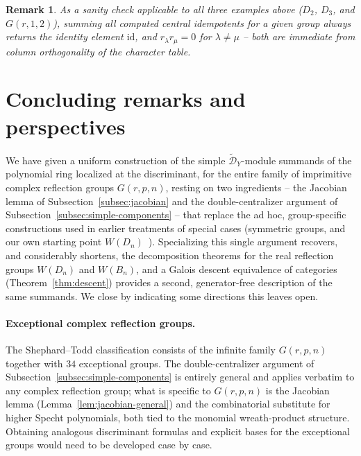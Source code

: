 \documentclass[11pt,a4paper]{article}
\newtheorem{remark}[theorem]{Remark}
\begin{document}
\begin{remark}
As a sanity check applicable to all three examples above ($D_2$,
$D_3$, and $G(r,1,2)$), summing all
computed central idempotents for a given group always returns the
identity element $\mathrm{id}$, and $r_\lambda r_\mu = 0$ for
$\lambda \ne \mu$ -- both are immediate from column orthogonality of
the character table.
\end{remark}

\section{Concluding remarks and perspectives}\label{sec:conclusion}

We have given a uniform construction of the simple
$\widetilde{\mathcal{D}}_Y$-module summands of the polynomial ring
localized at the discriminant, for the entire family of imprimitive
complex reflection groups $G(r,p,n)$, resting on two ingredients --
the Jacobian lemma of Subsection~\ref{subsec:jacobian} and the
double-centralizer argument of Subsection~\ref{subsec:simple-components} -- that
replace the ad hoc, group-specific constructions used in earlier
treatments of special cases (symmetric groups, and our own starting
point $W(D_n)$~\cite{NonkaneLawson2021}). Specializing this single argument recovers, and
considerably shortens, the decomposition theorems for the real
reflection groups $W(D_n)$ and $W(B_n)$, and a Galois descent
equivalence of categories (Theorem~\ref{thm:descent}) provides a
second, generator-free description of the same summands. We close by
indicating some directions this leaves open.

\paragraph{Exceptional complex reflection groups.} The Shephard--Todd
classification consists of the infinite family $G(r,p,n)$ together
with $34$ exceptional groups. The double-centralizer argument of
Subsection~\ref{subsec:simple-components} is entirely general and applies
verbatim to any complex reflection group; what is specific to
$G(r,p,n)$ is the Jacobian lemma (Lemma~\ref{lem:jacobian-general})
and the combinatorial substitute for higher Specht polynomials, both
tied to the monomial wreath-product structure. Obtaining analogous
discriminant formulas and explicit bases for the exceptional groups
would need to be developed case by case.
\end{document}
